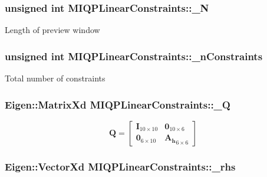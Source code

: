 \hypertarget{classMIQPLinearConstraints_a1edaf84d613dde3f86fd9e78aa14a077}{
\subsubsection[{\-\_\-\-N}]{\setlength{\rightskip}{0pt plus 5cm}unsigned int {\bf \-M\-I\-Q\-P\-Linear\-Constraints\-::\-\_\-\-N}}}\label{classMIQPLinearConstraints_a1edaf84d613dde3f86fd9e78aa14a077}
\-Length of preview window \hypertarget{classMIQPLinearConstraints_a2726424eb890fe556ce503096b418d0f}{
\subsubsection[{\-\_\-n\-Constraints}]{\setlength{\rightskip}{0pt plus 5cm}unsigned int {\bf \-M\-I\-Q\-P\-Linear\-Constraints\-::\-\_\-n\-Constraints}}}\label{classMIQPLinearConstraints_a2726424eb890fe556ce503096b418d0f}
\-Total number of constraints \hypertarget{classMIQPLinearConstraints_afecaf6e02135bfba45045fab6cce3511}{
\subsubsection[{\-\_\-\-Q}]{\setlength{\rightskip}{0pt plus 5cm}\-Eigen\-::\-Matrix\-Xd {\bf \-M\-I\-Q\-P\-Linear\-Constraints\-::\-\_\-\-Q}}}\label{classMIQPLinearConstraints_afecaf6e02135bfba45045fab6cce3511}
\[ \mathbf{Q} = \left[\begin{array}{cc} \mathbf{I}_{10\times10} & \mathbf{0}_{10\times6}\\ \mathbf{0}_{6\times10} & \mathbf{A_h}_{6\times6} \end{array}\right] \] \hypertarget{classMIQPLinearConstraints_ac8df74075c393100f5bddcb371503530}{
\subsubsection[{\-\_\-rhs}]{\setlength{\rightskip}{0pt plus 5cm}\-Eigen\-::\-Vector\-Xd {\bf \-M\-I\-Q\-P\-Linear\-Constraints\-::\-\_\-rhs}}}\label{classMIQPLinearConstraints_ac8df74075c393100f5bddcb371503530}
